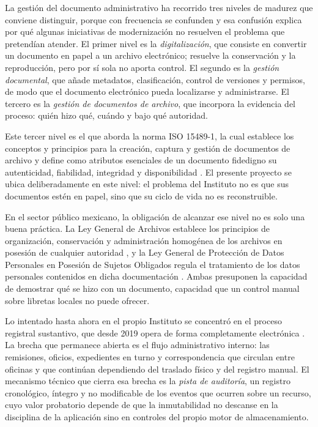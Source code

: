La gestión del documento administrativo ha recorrido tres niveles de madurez que conviene distinguir, porque con frecuencia se confunden y esa confusión explica por qué algunas iniciativas de modernización no resuelven el problema que pretendían atender. El primer nivel es la \textit{digitalización}, que consiste en convertir un documento en papel a un archivo electrónico; resuelve la conservación y la reproducción, pero por sí sola no aporta control. El segundo es la \textit{gestión documental}, que añade metadatos, clasificación, control de versiones y permisos, de modo que el documento electrónico pueda localizarse y administrarse. El tercero es la \textit{gestión de documentos de archivo}, que incorpora la evidencia del proceso: quién hizo qué, cuándo y bajo qué autoridad.

Este tercer nivel es el que aborda la norma ISO 15489-1, la cual establece los conceptos y principios para la creación, captura y gestión de documentos de archivo y define como atributos esenciales de un documento fidedigno su autenticidad, fiabilidad, integridad y disponibilidad \cite{iso15489}. El presente proyecto se ubica deliberadamente en este nivel: el problema del Instituto no es que sus documentos estén en papel, sino que su ciclo de vida no es reconstruible.

En el sector público mexicano, la obligación de alcanzar ese nivel no es solo una buena práctica. La Ley General de Archivos establece los principios de organización, conservación y administración homogénea de los archivos en posesión de cualquier autoridad \cite{lga2018}, y la Ley General de Protección de Datos Personales en Posesión de Sujetos Obligados regula el tratamiento de los datos personales contenidos en dicha documentación \cite{lgpdppso2017}. Ambas presuponen la capacidad de demostrar qué se hizo con un documento, capacidad que un control manual sobre libretas locales no puede ofrecer.

Lo intentado hasta ahora en el propio Instituto se concentró en el proceso registral sustantivo, que desde 2019 opera de forma completamente electrónica \cite{futuver2024}. La brecha que permanece abierta es el flujo administrativo interno: las remisiones, oficios, expedientes en turno y correspondencia que circulan entre oficinas y que continúan dependiendo del traslado físico y del registro manual. El mecanismo técnico que cierra esa brecha es la \textit{pista de auditoría}, un registro cronológico, íntegro y no modificable de los eventos que ocurren sobre un recurso, cuyo valor probatorio depende de que la inmutabilidad no descanse en la disciplina de la aplicación sino en controles del propio motor de almacenamiento.

